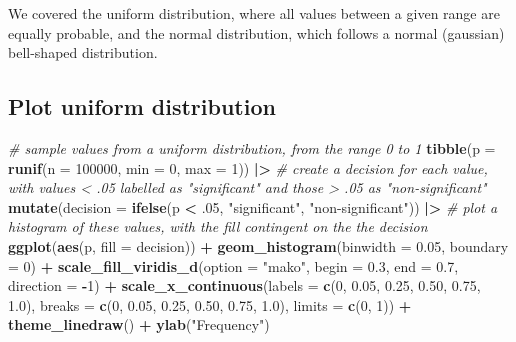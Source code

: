 \documentclass[
]{article}
\newenvironment{Shaded}{\begin{snugshade}}{\end{snugshade}}
\newcommand{\AttributeTok}[1]{\textcolor[rgb]{0.13,0.29,0.53}{#1}}
\newcommand{\CommentTok}[1]{\textcolor[rgb]{0.56,0.35,0.01}{\textit{#1}}}
\newcommand{\DecValTok}[1]{\textcolor[rgb]{0.00,0.00,0.81}{#1}}
\newcommand{\FloatTok}[1]{\textcolor[rgb]{0.00,0.00,0.81}{#1}}
\newcommand{\FunctionTok}[1]{\textcolor[rgb]{0.13,0.29,0.53}{\textbf{#1}}}
\newcommand{\NormalTok}[1]{#1}
\newcommand{\SpecialCharTok}[1]{\textcolor[rgb]{0.81,0.36,0.00}{\textbf{#1}}}
\newcommand{\StringTok}[1]{\textcolor[rgb]{0.31,0.60,0.02}{#1}}
\begin{document}
We covered the uniform distribution, where all values between a given
range are equally probable, and the normal distribution, which follows a
normal (gaussian) bell-shaped distribution.

\hypertarget{plot-uniform-distribution}{%
\subsection{Plot uniform distribution}\label{plot-uniform-distribution}}

\begin{Shaded}
\begin{Highlighting}[]
\CommentTok{\# sample values from a uniform distribution, from the range 0 to 1}
\FunctionTok{tibble}\NormalTok{(}\AttributeTok{p =} \FunctionTok{runif}\NormalTok{(}\AttributeTok{n =} \DecValTok{100000}\NormalTok{, }\AttributeTok{min =} \DecValTok{0}\NormalTok{, }\AttributeTok{max =} \DecValTok{1}\NormalTok{)) }\SpecialCharTok{|\textgreater{}}
  \CommentTok{\# create a decision for each value, with values \textless{} .05 labelled as "significant" and those \textgreater{} .05 as "non{-}significant"}
  \FunctionTok{mutate}\NormalTok{(}\AttributeTok{decision =} \FunctionTok{ifelse}\NormalTok{(p }\SpecialCharTok{\textless{}}\NormalTok{ .}\DecValTok{05}\NormalTok{, }\StringTok{"significant"}\NormalTok{, }\StringTok{"non{-}significant"}\NormalTok{)) }\SpecialCharTok{|\textgreater{}}
  \CommentTok{\# plot a histogram of these values, with the fill contingent on the the decision}
  \FunctionTok{ggplot}\NormalTok{(}\FunctionTok{aes}\NormalTok{(p, }\AttributeTok{fill =}\NormalTok{ decision)) }\SpecialCharTok{+}
  \FunctionTok{geom\_histogram}\NormalTok{(}\AttributeTok{binwidth =} \FloatTok{0.05}\NormalTok{, }\AttributeTok{boundary =} \DecValTok{0}\NormalTok{) }\SpecialCharTok{+}
  \FunctionTok{scale\_fill\_viridis\_d}\NormalTok{(}\AttributeTok{option =} \StringTok{"mako"}\NormalTok{, }\AttributeTok{begin =} \FloatTok{0.3}\NormalTok{, }\AttributeTok{end =} \FloatTok{0.7}\NormalTok{, }\AttributeTok{direction =} \SpecialCharTok{{-}}\DecValTok{1}\NormalTok{) }\SpecialCharTok{+}
  \FunctionTok{scale\_x\_continuous}\NormalTok{(}\AttributeTok{labels =} \FunctionTok{c}\NormalTok{(}\DecValTok{0}\NormalTok{, }\FloatTok{0.05}\NormalTok{, }\FloatTok{0.25}\NormalTok{, }\FloatTok{0.50}\NormalTok{, }\FloatTok{0.75}\NormalTok{, }\FloatTok{1.0}\NormalTok{),}
                     \AttributeTok{breaks =} \FunctionTok{c}\NormalTok{(}\DecValTok{0}\NormalTok{, }\FloatTok{0.05}\NormalTok{, }\FloatTok{0.25}\NormalTok{, }\FloatTok{0.50}\NormalTok{, }\FloatTok{0.75}\NormalTok{, }\FloatTok{1.0}\NormalTok{), }
                     \AttributeTok{limits =} \FunctionTok{c}\NormalTok{(}\DecValTok{0}\NormalTok{, }\DecValTok{1}\NormalTok{)) }\SpecialCharTok{+}
  \FunctionTok{theme\_linedraw}\NormalTok{() }\SpecialCharTok{+}
  \FunctionTok{ylab}\NormalTok{(}\StringTok{"Frequency"}\NormalTok{)}
\end{Highlighting}
\end{Shaded}
\end{document}
